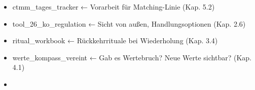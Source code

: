 \begin{itemize}[label=\textcolor{ctmmOrange}{\faArrowRight}]
\item
  ctmm\_tages\_tracker ← Vorarbeit für Matching-Linie (Kap. 5.2)
\item
  tool\_26\_ko\_regulation ← Sicht von außen, Handlungsoptionen (Kap. 2.6)
\item
  ritual\_workbook ← Rückkehrrituale bei Wiederholung (Kap. 3.4)
\item
  werte\_kompass\_vereint ← Gab es Wertebruch? Neue Werte sichtbar? (Kap. 4.1)
\item
\end{itemize}

📎 \textbf{\textcolor{ctmmBlue}{\1}}

\textbf{\textcolor{ctmmBlue}{\1}}
